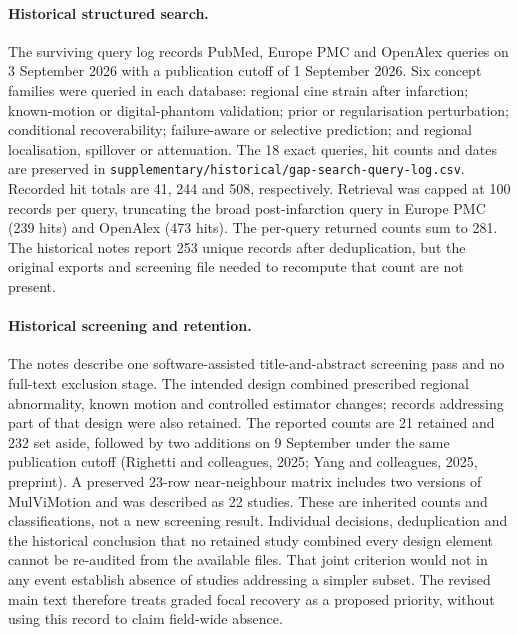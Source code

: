 \documentclass[11pt,a4paper]{article}
\begin{document}
\paragraph{Historical structured search.} The surviving query log records PubMed, Europe PMC and OpenAlex queries on 3 September 2026 with a publication cutoff of 1 September 2026. Six concept families were queried in each database: regional cine strain after infarction; known-motion or digital-phantom validation; prior or regularisation perturbation; conditional recoverability; failure-aware or selective prediction; and regional localisation, spillover or attenuation. The 18 exact queries, hit counts and dates are preserved in \texttt{supplementary/historical/gap-search-query-log.csv}. Recorded hit totals are 41, 244 and 508, respectively. Retrieval was capped at 100 records per query, truncating the broad post-infarction query in Europe PMC (239 hits) and OpenAlex (473 hits). The per-query returned counts sum to 281. The historical notes report 253 unique records after deduplication, but the original exports and screening file needed to recompute that count are not present.

\paragraph{Historical screening and retention.} The notes describe one software-assisted title-and-abstract screening pass and no full-text exclusion stage. The intended design combined prescribed regional abnormality, known motion and controlled estimator changes; records addressing part of that design were also retained. The reported counts are 21 retained and 232 set aside, followed by two additions on 9 September under the same publication cutoff (Righetti and colleagues, 2025; Yang and colleagues, 2025, preprint). A preserved 23-row near-neighbour matrix includes two versions of MulViMotion and was described as 22 studies. These are inherited counts and classifications, not a new screening result. Individual decisions, deduplication and the historical conclusion that no retained study combined every design element cannot be re-audited from the available files. That joint criterion would not in any event establish absence of studies addressing a simpler subset. The revised main text therefore treats graded focal recovery as a proposed priority, without using this record to claim field-wide absence.
\end{document}
